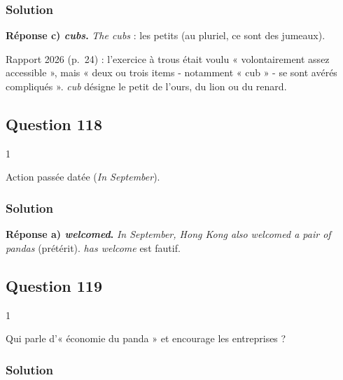 \documentclass[11pt,a4paper]{article}
\begin{document}
\hypertarget{solution-116}{%
\subsubsection{Solution}\label{solution-116}}

\textbf{Réponse c) \emph{cubs}.} \emph{The cubs} : les petits (au pluriel, ce sont des jumeaux).

\begin{jury}

Rapport 2026 (p.~24) : l'exercice à trous était voulu « volontairement assez accessible », mais « deux ou trois items - notamment « cub » - se sont avérés compliqués ». \emph{cub} désigne le petit de l'ours, du lion ou du renard.

\end{jury}

\hypertarget{question-118}{%
\subsection{Question 118}\label{question-118}}

\begin{indication}{1}

Action passée datée (\emph{In September}).

\end{indication}

\hypertarget{solution-117}{%
\subsubsection{Solution}\label{solution-117}}

\textbf{Réponse a) \emph{welcomed}.} \emph{In September, Hong Kong also welcomed a pair of pandas} (prétérit). \emph{has welcome} est fautif.

\hypertarget{question-119}{%
\subsection{Question 119}\label{question-119}}

\begin{indication}{1}

Qui parle d'« économie du panda » et encourage les entreprises ?

\end{indication}

\hypertarget{solution-118}{%
\subsubsection{Solution}\label{solution-118}}
\end{document}
